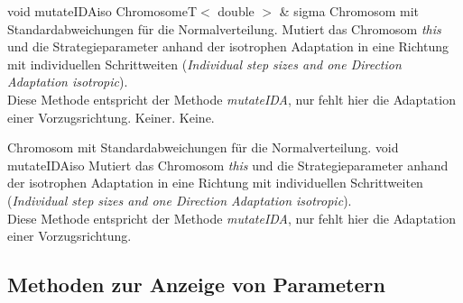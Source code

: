 \documentclass{report}
\begin{document}
\vspace{4ex}

\setNormalInstance
\printMethodWithOneParam
{void}
{mutateIDAiso}
{ChromosomeT$<$ double $>$ \&}
{sigma}
{Chromosom mit Standardabweichungen f\"ur die Normalverteilung.}
{Mutiert das Chromosom {\em this} und die Strategieparameter anhand der 
 isotrophen Adaptation in eine Richtung mit individuellen Schrittweiten 
 ({\em Individual step sizes and one Direction Adaptation isotropic}).\\
 Diese Methode entspricht der Methode {\em mutateIDA}, nur fehlt hier
 die Adaptation einer Vorzugsrichtung.}
{Keiner.}
{Keine.}

\vspace{4ex}

\setNormalInstance
\setCorrectWidthThree{8pt}
{Chromosom mit Standardabweichungen f\"ur die Normalverteilung.}
\printMethodWithParamsSaved
{void}
{}
{mutateIDAiso}
{Mutiert das Chromosom {\em this} und die Strategieparameter anhand der 
 isotrophen Adaptation in eine Richtung mit individuellen Schrittweiten 
 ({\em Individual step sizes and one Direction Adaptation isotropic}).\\
 Diese Methode entspricht der Methode {\em mutateIDA}, nur fehlt hier
 die Adaptation einer Vorzugsrichtung.}
{}
\setCorrectWidthThree{4pt}

\newpage

\subsection{Methoden zur Anzeige von Parametern}
\end{document}

